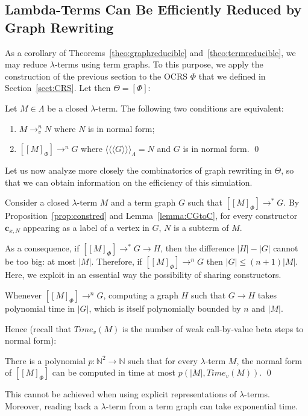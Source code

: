 \documentclass{LMCS}
\newcommand{\varone}{x}
\newcommand{\lambdaone}{M}
\newcommand{\lambdatwo}{N}
\newcommand{\tgone}{G}
\newcommand{\tgtwo}{H}
\newcommand{\constr}[2]{\mathbf{c}_{#1,#2}}
\newcommand{\LambdatoTRS}[1]{[#1]_{\Phi}}
\newcommand{\TRSonetolambdaI}[1]{\langle\!\langle #1\rangle\!\rangle_{\Lambdaterms}}
\newcommand{\TRStoGRS}[1]{[#1]}
\newcommand{\GRStoTRS}[1]{\langle #1\rangle}
\newcommand{\Lambdaterms}{\Lambda}
\newcommand{\TRS}{\Phi}
\newcommand{\GRS}{\Theta}
\newcommand{\CtoCG}[1]{[#1]}
\newcommand{\Time}[1]{\mathit{Time}_v(#1)}
\newcommand{\rewrTRS}{\rightarrow}
\newcommand{\rewrlambdav}{\rightarrow_v}
\newcommand{\rewrgraph}{\rightarrow}
\newcommand{\N}{\mathbb{N}}
\newcommand{\length}[1]{|#1|}
\newenvironment{varitemize}
{
\begin{list}{\labelitemi}
{\setlength{\itemsep}{0.0mm}
 \setlength{\topsep}{0.0mm}
 \setlength{\parindent}{0.0mm}
 \setlength{\parskip}{0.0mm}
 \setlength{\parsep}{0.0mm}
 \setlength{\partopsep}{0.0mm}
 \setlength{\leftmargin}{15pt}
 \setlength{\labelsep}{5pt}
 \setlength{\labelwidth}{10pt}}}
{
 \end{list} 
}
\newcounter{number}
\begin{document}
\subsection{Lambda-Terms Can Be Efficiently Reduced by Graph Rewriting}
\label{sect:MainResult}
As a corollary of Theorems~\ref{theo:graphreducible} and~\ref{theo:termreducible},
we may reduce $\lambda$-terms using term graphs.
To this purpose, we apply the construction of the previous section
to the OCRS $\TRS$ that we defined in Section~\ref{sect:CRS}. Let 
then $\GRS=\CtoCG{\TRS}$:
\begin{cor}
Let $\lambdaone\in\Lambdaterms$ be a closed $\lambda$-term. The following
two conditions are equivalent:
\begin{enumerate}[\em 1.]
\item
  $\lambdaone\rewrlambdav^n\lambdatwo$ where $\lambdatwo$ is in normal form;
\item
  $\TRStoGRS{\LambdatoTRS{\lambdaone}}\rewrTRS^n\tgone$ where
  $\TRSonetolambdaI{\GRStoTRS{\tgone}}=\lambdatwo$ and $\tgone$ is in normal form. \qed
\end{enumerate}
\end{cor} 
Let us now analyze more closely the combinatorics 
of graph rewriting in $\GRS$, so that we can obtain information on the efficiency of this simulation. 
\begin{varitemize}
\item
  Consider a closed $\lambda$-term $\lambdaone$ and a term graph $\tgone$ such
  that $\TRStoGRS{\LambdatoTRS{\lambdaone}}\rewrgraph^*\tgone$. By Proposition~\ref{prop:constred}
  and Lemma~\ref{lemma:CGtoC}, for every constructor $\constr{\varone}{\lambdatwo}$ appearing
  as a label of a vertex in $\tgone$, $\lambdatwo$ is a subterm of $\lambdaone$. 
\item
  As a consequence, if $\TRStoGRS{\LambdatoTRS{\lambdaone}}\rewrgraph^*\tgone\rewrgraph\tgtwo$,
  then the difference $\length{\tgtwo}-\length{\tgone}$ cannot be too big: at most
  $\length{\lambdaone}$. Therefore, if 
  $\TRStoGRS{\LambdatoTRS{\lambdaone}}\rewrgraph^n\tgone$ then $\length{\tgone}\leq(n+1)\length{\lambdaone}$.
  Here, we exploit in an essential way the possibility of sharing constructors.
\item
  Whenever $\TRStoGRS{\LambdatoTRS{\lambdaone}}\rewrgraph^n\tgone$, computing
  a graph $\tgtwo$ such that $\tgone\rewrgraph\tgtwo$ takes polynomial time in
  $\length{\tgone}$, which is itself polynomially bounded by $n$ and $\length{\lambdaone}$.
\end{varitemize}
Hence (recall that $\Time{\lambdaone}$ is the number of weak call-by-value beta steps to normal form): 
\begin{thm}\label{thm:main}
There is a polynomial $p:\N^2\rightarrow\N$ such that for every $\lambda$-term $\lambdaone$,
the normal form of $\TRStoGRS{\LambdatoTRS{\lambdaone}}$ can be computed in time at most 
$p(|\lambdaone|,\Time{\lambdaone})$. \qed
\end{thm}
This cannot be achieved when using explicit representations
of $\lambda$-terms. Moreover, reading back a $\lambda$-term from a term graph can take exponential
time.
\end{document}
